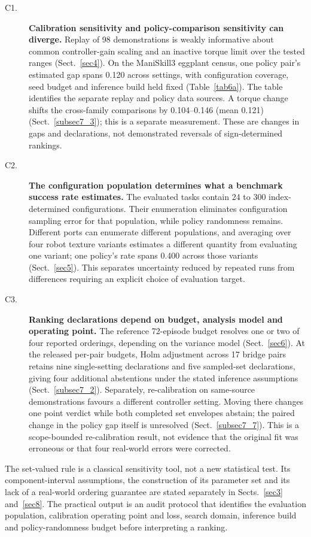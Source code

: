 \documentclass[pdflatex,iicol,sn-apa]{sn-jnl}
\theoremstyle{remark}
\begin{document}
\begin{description}
\item[C1.] \textbf{Calibration sensitivity and policy-comparison sensitivity can diverge.}
Replay of 98 demonstrations is weakly informative about common controller-gain scaling and an
inactive torque limit over the tested ranges (Sect.~\ref{sec4}). On the ManiSkill3 eggplant census,
one policy pair's estimated gap spans 0.120 across settings, with configuration coverage, seed
budget and inference build held fixed (Table~\ref{tab6a}). The table identifies the separate replay
and policy data sources. A torque change shifts the cross-family comparisons by 0.104--0.146
(mean 0.121)
(Sect.~\ref{subsec7_3}); this is a separate measurement. These are changes in gaps and declarations,
not demonstrated reversals of sign-determined rankings.
\item[C2.] \textbf{The configuration population determines what a benchmark success rate estimates.}
The evaluated tasks contain 24 to 300 index-determined configurations. Their enumeration eliminates
configuration sampling error for that population, while policy randomness remains. Different ports
can enumerate different populations, and averaging over four robot texture variants estimates a
different quantity from evaluating one variant; one policy's rate spans 0.400 across those variants
(Sect.~\ref{sec5}). This separates uncertainty reduced by repeated runs from differences requiring
an explicit choice of evaluation target.
\item[C3.] \textbf{Ranking declarations depend on budget, analysis model and operating point.}
The reference 72-episode budget resolves one or two of four reported orderings, depending on the
variance model (Sect.~\ref{sec6}). At the released per-pair budgets, Holm adjustment across 17 bridge
pairs retains nine single-setting declarations and five sampled-set declarations, giving four
additional abstentions under the stated inference assumptions (Sect.~\ref{subsec7_2}). Separately,
re-calibration on same-source demonstrations favours a different controller setting. Moving there
changes one point verdict while both completed set envelopes abstain; the paired change in the
policy gap itself is unresolved (Sect.~\ref{subsec7_7}). This is a scope-bounded re-calibration result,
not evidence that the original fit was erroneous or that four real-world errors were corrected.
\end{description}

\noindent The set-valued rule is a classical sensitivity tool, not a new statistical test. Its
component-interval assumptions, the construction of its parameter set and its lack of a real-world
ordering guarantee are stated separately in Sects.~\ref{sec3} and~\ref{sec8}. The practical output is
an audit protocol that identifies the evaluation population, calibration operating point and loss,
search domain, inference build and policy-randomness budget before interpreting a ranking.
\end{document}
